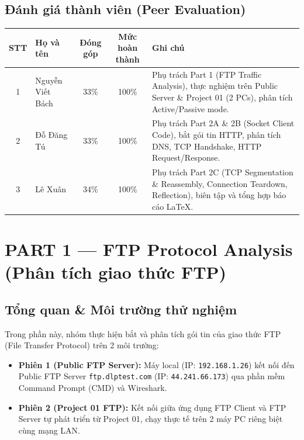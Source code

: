 \documentclass[12pt,a4paper]{article}
\begin{document}
\subsection{Đánh giá thành viên (Peer Evaluation)}
\begin{center}
  \footnotesize
  \begin{tabularx}{\textwidth}{@{} c p{3.2cm} c c X @{}}
    \toprule
    \textbf{STT} & \textbf{Họ và tên} & \textbf{Đóng góp} & \textbf{Mức hoàn thành} & \textbf{Ghi chú} \\
    \midrule
    1 & Nguyễn Viết Bách & 33\% & 100\% & Phụ trách Part 1 (FTP Traffic Analysis), thực nghiệm trên Public Server \& Project 01 (2 PCs), phân tích Active/Passive mode. \\
    \midrule
    2 & Đỗ Đăng Tú & 33\% & 100\% & Phụ trách Part 2A \& 2B (Socket Client Code), bắt gói tin HTTP, phân tích DNS, TCP Handshake, HTTP Request/Response. \\
    \midrule
    3 & Lê Xuân & 34\% & 100\% & Phụ trách Part 2C (TCP Segmentation \& Reassembly, Connection Teardown, Reflection), biên tập và tổng hợp báo cáo LaTeX. \\
    \bottomrule
  \end{tabularx}
  \vspace{0.15cm}
  \label{tab:peer_evaluation}
\end{center}

\section{PART 1 --- FTP Protocol Analysis (Phân tích giao thức FTP)}

\subsection{Tổng quan \& Môi trường thử nghiệm}
Trong phần này, nhóm thực hiện bắt và phân tích gói tin của giao thức FTP (File Transfer Protocol) trên 2 môi trường:
\begin{itemize}
  \item \textbf{Phiên 1 (Public FTP Server):} Máy local (IP: \texttt{192.168.1.26}) kết nối đến Public FTP Server \texttt{ftp.dlptest.com} (IP: \texttt{44.241.66.173}) qua phần mềm Command Prompt (CMD) và Wireshark.
  \item \textbf{Phiên 2 (Project 01 FTP):} Kết nối giữa ứng dụng FTP Client và FTP Server tự phát triển từ Project 01, chạy thực tế trên 2 máy PC riêng biệt cùng mạng LAN.
\end{itemize}
\end{document}
